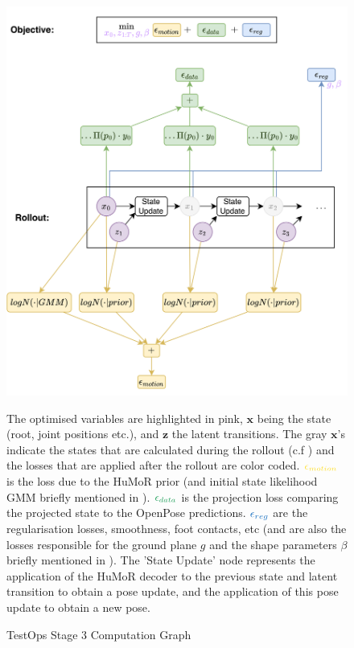 \begin{figure}
    \label{fig:humor_rollout_graph}
    \centering
    \includegraphics[width=1\textwidth]{Figures/humor/improvement/computation_graph_humor.png}
    \caption{TestOps Stage 3 Computation Graph}
    \medskip
    \small
    The optimised variables are highlighted in pink, $\mathbf{x}$ being the state (root, joint positions etc.), and $\mathbf{z}$ the latent transitions. The gray $\mathbf{x}$'s indicate the states that are calculated during the rollout (c.f ) and the losses that are applied after the rollout are color coded. $\textcolor{Goldenrod}{\epsilon_{motion}}$ is the loss due to the HuMoR prior (and initial state likelihood GMM briefly mentioned in ). $\textcolor{ForestGreen}{\epsilon_{data}}$ is the projection loss comparing the projected state to the OpenPose predictions. $\textcolor{RoyalBlue}{\epsilon_{reg}}$ are the regularisation losses, smoothness, foot contacts, etc (and are also the losses responsible for the ground plane $g$ and the shape parameters $\beta$ briefly mentioned in ). The 'State Update' node represents the application of the HuMoR decoder to the previous state and latent transition to obtain a pose update, and the application of this pose update to obtain a new pose.
\end{figure}

